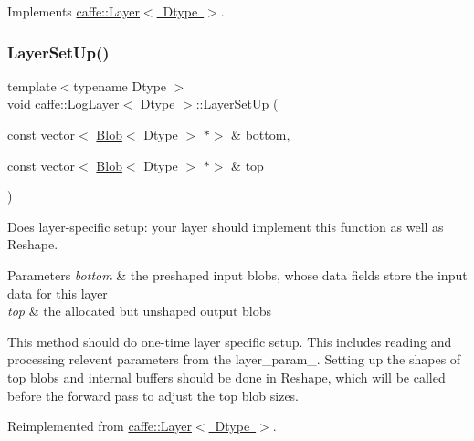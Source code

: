 Implements \mbox{\hyperlink{classcaffe_1_1_layer_a576ac6a60b1e99fe383831f52a6cea77}{caffe\+::\+Layer$<$ Dtype $>$}}.

\mbox{\label{classcaffe_1_1_log_layer_a87e062000908b474ac4cda3b2f3c6f1e}} 
\subsubsection{\texorpdfstring{Layer\+Set\+Up()}{LayerSetUp()}\hspace{0.1cm}{\footnotesize\ttfamily [1/2]}}
{\footnotesize\ttfamily template$<$typename Dtype $>$ \\
void \mbox{\hyperlink{classcaffe_1_1_log_layer}{caffe\+::\+Log\+Layer}}$<$ Dtype $>$\+::Layer\+Set\+Up (\begin{DoxyParamCaption}\item[{const vector$<$ \mbox{\hyperlink{classcaffe_1_1_blob}{Blob}}$<$ Dtype $>$ $\ast$$>$ \&}]{bottom,  }\item[{const vector$<$ \mbox{\hyperlink{classcaffe_1_1_blob}{Blob}}$<$ Dtype $>$ $\ast$$>$ \&}]{top }\end{DoxyParamCaption})\hspace{0.3cm}{\ttfamily [virtual]}}



Does layer-\/specific setup\+: your layer should implement this function as well as Reshape. 


\begin{DoxyParams}{Parameters}
{\em bottom} & the preshaped input blobs, whose data fields store the input data for this layer \\
\hline
{\em top} & the allocated but unshaped output blobs\\
\hline
\end{DoxyParams}
This method should do one-\/time layer specific setup. This includes reading and processing relevent parameters from the {\ttfamily layer\+\_\+param\+\_\+}. Setting up the shapes of top blobs and internal buffers should be done in {\ttfamily Reshape}, which will be called before the forward pass to adjust the top blob sizes. 

Reimplemented from \mbox{\hyperlink{classcaffe_1_1_layer_a481323a3e0972c682787f2137468c29f}{caffe\+::\+Layer$<$ Dtype $>$}}.

